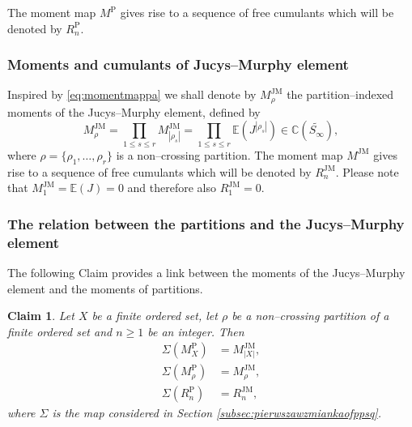 \documentclass[12pt,dvips]{amsart}
\numberwithin{equation}{section} \numberwithin{figure}{section}
\theoremstyle{plain}
\newtheorem{claim}[lemma]{Claim}
\theoremstyle{definition}
\theoremstyle{remark}
\newcommand{\A}{{\mathfrak{A}}}
\newcommand{\E}{{\mathbb{E}}}
\newcommand{\C}{{\mathbb{C}}}
\newcommand{\Sn}[1]{{{S}}_{#1}}
\newcommand{\MJM}{M^{\JM}}
\newcommand{\Mpp}{M^{\pp}}
\newcommand{\RJM}{R^{\JM}}
\newcommand{\Rpp}{R^{\pp}}
\newcommand{\PartPerm}[1]{\widetilde{\Sn{#1}}}
\DeclareMathOperator{\JM}{JM}
\DeclareMathOperator{\pp}{P}
\DeclareMathOperator{\NC}{NC}
\begin{document}
The moment map $\Mpp$ gives rise to a sequence of free cumulants
which will be denoted by $\Rpp_n$.





\subsubsection{Moments and cumulants of Jucys--Murphy
element}

\label{subsec:momentmap}
%

Inspired by \eqref{eq:momentmappa} we shall denote by $\MJM_\rho$
the partition--indexed moments of the Jucys--Murphy element, defined
by
\begin{equation}
\label{eq:momentmap} \MJM_{\rho}=\prod_{1\leq s\leq r}
\MJM_{|\rho_s|}=\prod_{1\leq s\leq r}
\E(J^{|\rho_s|})\in\C(\PartPerm{\infty}),
\end{equation}
where $\rho=\{\rho_1,\dots,\rho_r\}$ is a non--crossing partition.
The moment map $\MJM$ gives rise to a sequence of free cumulants
which will be denoted by $\RJM_n$. Please note that $\MJM_1=\E(J)=0$
and therefore also $\RJM_1=0$.




\subsubsection{The relation between the partitions and the Jucys--Murphy
element} The following Claim provides a link between the moments of
the Jucys--Murphy element and the moments of partitions.
\begin{claim}
\label{claim:dobryjurcysmurphy} Let $X$ be a finite ordered set, let
$\rho$ be a non--crossing partition of a finite ordered set and
$n\geq 1$ be an integer.
Then \begin{align} \label{eq:claim1} \Sigma(\Mpp_{X}) &=\MJM_{|X|}, \\
\label{eq:claim2} \Sigma(\Mpp_\rho)&=\MJM_\rho, \\
\label{eq:claim3} \Sigma(\Rpp_n)&=\RJM_n, \end{align} where $\Sigma$
is the map considered in Section
\ref{subsec:pierwszawzmiankaofppsq}.
\end{claim}
\end{document}
